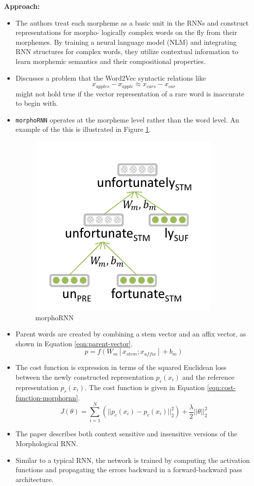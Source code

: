 \documentclass[11pt,a4paper]{article}
\begin{document}
  \textbf{Approach:}
  \begin{itemize}
    \item 
    The authors treat each morpheme as a basic unit in the RNNs and construct representations for morpho- logically complex words on the fly from their morphemes. By training a neural language model (NLM) and integrating RNN structures for complex words, they utilize contextual information to learn morphemic semantics and their compositional properties.
    \item 
    Discusses a problem that the Word2Vec syntactic relations like $$x_{apples} - x_{apple} \approx x_{cars} - x_{car}$$ might not hold true if the vector representation of a rare word is inaccurate to begin with.
    \item 
    \texttt{morphoRNN} operates at the morpheme level rather than the word level. An example of the this is illustrated in Figure \ref{fig:rnn-morphology}.
    \begin{figure}[ht]
      \centering
      \includegraphics[width=.4\textwidth]{rnn-morphology}
      \caption{morphoRNN}
      \label{fig:rnn-morphology}
    \end{figure}
    \item 
    Parent words are created by combining a stem vector and an affix vector, as shown in Equation \ref{eqn:parent-vector}.
    \begin{equation} \label{eqn:parent-vector}
      p = f (W_m [x_{stem} ; x_{affix}] + b_m)
    \end{equation}
    \item 
    The cost function is expression in terms of the squared Euclidean loss between the newly constructed representation $p_c(x_i)$ and the reference representation $p_r(x_i)$. The cost function is given in Equation \ref{eqn:cost-function-morphornn}.
    \begin{equation} \label{eqn:cost-function-morphornn}
      J(\theta) = \sum_{i=1}^N (|| p_c(x_i) - p_c(x_i) ||^2_2) + \frac{\lambda}{2} ||\theta||^2_2
    \end{equation}
    \item 
    The paper describes both context sensitive and insensitive versions of the Morphological RNN.
    \item 
    Similar to a typical RNN, the network is trained by computing the activation functions and propagating the errors backward in a forward-backward pass architecture.
  \end{itemize}
\end{document}
